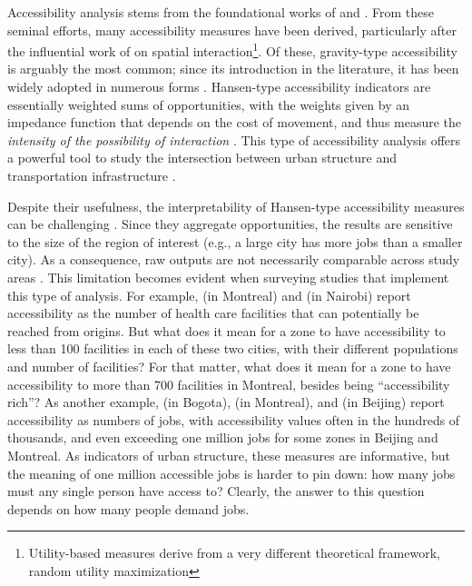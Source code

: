 \documentclass[]{elsarticle} %
\begin{document}
Accessibility analysis stems from the foundational works of
\citet{harris_market_1954} and \citet{hansen1959}. From these seminal
efforts, many accessibility measures have been derived, particularly
after the influential work of \citet{wilson1971} on spatial
interaction\footnote{Utility-based measures derive from a very different
  theoretical framework, random utility maximization}. Of these,
gravity-type accessibility is arguably the most common; since its
introduction in the literature, it has been widely adopted in numerous
forms
\citep{cervero_transportation_2002, paez2004network, geurs2004, levinson_accessibility_1998, Arranz2019measuring}.
Hansen-type accessibility indicators are essentially weighted sums of
opportunities, with the weights given by an impedance function that
depends on the cost of movement, and thus measure the \emph{intensity of
the possibility of interaction} \citep{hansen1959}. This type of
accessibility analysis offers a powerful tool to study the intersection
between urban structure and transportation infrastructure
\citep{handy_measuring_1997}.

Despite their usefulness, the interpretability of Hansen-type
accessibility measures can be challenging \citep{geurs2004, miller2018}.
Since they aggregate opportunities, the results are sensitive to the
size of the region of interest (e.g., a large city has more jobs than a
smaller city). As a consequence, raw outputs are not necessarily
comparable across study areas \citep{allen2019}. This limitation becomes
evident when surveying studies that implement this type of analysis. For
example, \citet{paez_healthcare_2010} (in Montreal) and
\citet{campbell_2019_accessibility} (in Nairobi) report accessibility as
the number of health care facilities that can potentially be reached
from origins. But what does it mean for a zone to have accessibility to
less than 100 facilities in each of these two cities, with their
different populations and number of facilities? For that matter, what
does it mean for a zone to have accessibility to more than 700
facilities in Montreal, besides being ``accessibility rich''? As another
example, \citet{bocarejo_s_transport_2012} (in Bogota),
\citet{elgeneidy_cost_2016} (in Montreal), and
\citet{jiang_2016_accessibility} (in Beijing) report accessibility as
numbers of jobs, with accessibility values often in the hundreds of
thousands, and even exceeding one million jobs for some zones in Beijing
and Montreal. As indicators of urban structure, these measures are
informative, but the meaning of one million accessible jobs is harder to
pin down: how many jobs must any single person have access to? Clearly,
the answer to this question depends on how many people demand jobs.
\end{document}
